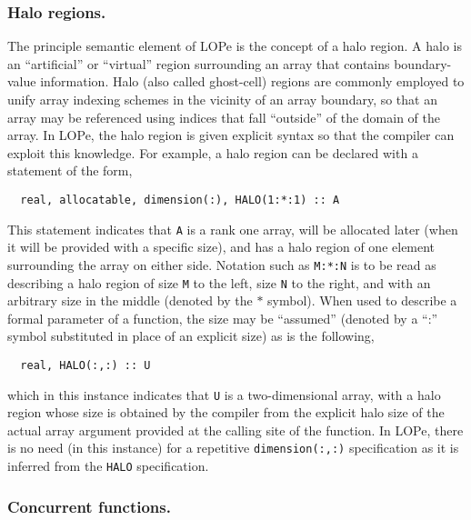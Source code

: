 \subsubsection{Halo regions.}

The principle semantic element of LOPe is the concept of a halo region.  A halo is an ``artificial''
or ``virtual'' region surrounding an array that contains boundary-value information.  Halo (also
called ghost-cell) regions are commonly employed to unify array indexing schemes in the vicinity of
an array boundary, so that an array may be referenced using indices that fall ``outside'' of the
domain of the array.  In LOPe, the halo region is given explicit syntax so that the compiler can
exploit this knowledge.  For example, a halo region can be declared with a statement of the form,
\begin{verbatim}
  real, allocatable, dimension(:), HALO(1:*:1) :: A
\end{verbatim}
This statement indicates that \texttt{A} is a rank one array, will be allocated later (when it will
be provided with a specific size), and has a halo region of one element surrounding the array on
either side.  Notation such as \texttt{M:*:N} is to be read as describing a halo region of size
\texttt{M} to the left, size \texttt{N} to the right, and with an arbitrary size in the middle
(denoted by the $*$ symbol).  When used to describe a formal parameter of a function, the size may
be ``assumed'' (denoted by a ``:'' symbol substituted in place of an explicit size) as is the
following,
\begin{verbatim}
  real, HALO(:,:) :: U
\end{verbatim}
which in this instance indicates that \texttt{U} is a two-dimensional array, with a halo region
whose size is obtained by the compiler from the explicit halo size of the actual array argument
provided at the calling site of the function.  In LOPe, there is no need (in this instance) for a
repetitive \texttt{dimension(:,:)} specification as it is inferred from the \texttt{HALO}
specification.

\subsubsection{Concurrent functions.}

